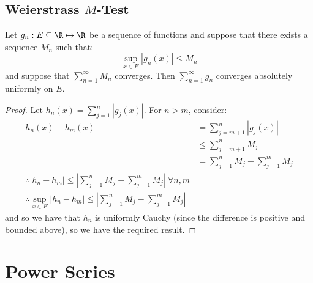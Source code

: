 \documentclass[../Main.tex]{subfiles}
\begin{document}
\subsection{Weierstrass \texorpdfstring{$M$}{M}-Test}
\begin{theorem}
    Let $g_n : E \subseteq \R \mapsto \R$ be a sequence of functions and suppose that there exists a sequence $M_n$ such that:
    \begin{equation*}
        \sup_{x \in E} |g_n(x)| \leq M_n
    \end{equation*}
    and suppose that $\sum_{n = 1}^\infty M_n$ converges. Then $\sum_{n = 1}^\infty g_n$ converges absolutely uniformly on $E$.
    \label{thmWstrassMTest}
\end{theorem}
\begin{proof}
    Let $h_n(x) = \sum_{j = 1}^n |g_j(x)|$. For $n > m$, consider:
    \begin{align*}
        h_n(x) - h_m(x) &= \sum_{j = m+1}^n |g_j(x)| \\
        &\leq \sum_{j=m+1}^{n}M_j \\
        &= \sum_{j=1}^{n} M_j - \sum_{j=1}^{m} M_j \\
        \therefore |h_n - h_m| \leq \left|\sum_{j=1}^{n} M_j - \sum_{j=1}^{m} M_j\right|~\forall n, m \\
        \therefore \sup_{x \in E}|h_n - h_m| \leq \left|\sum_{j=1}^{n} M_j - \sum_{j=1}^{m} M_j\right|
    \end{align*}
    and so we have that $h_n$ is uniformly Cauchy (since the difference is positive and bounded above), so we have the required result.
\end{proof}
\section{Power Series}
\end{document}
